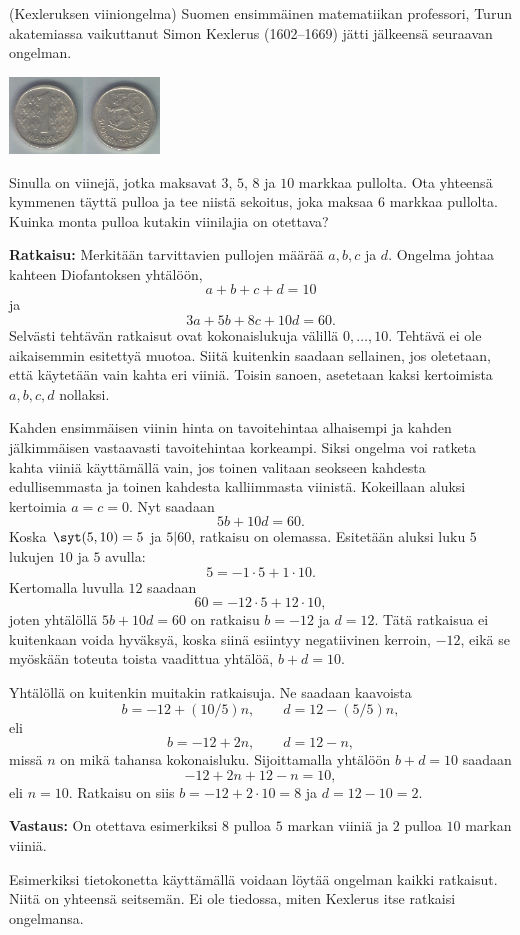 \begin{esimerkki}
 (Kexleruksen viiniongelma)
Suomen ensimmäinen matematiikan professori, Turun
akatemiassa vaikuttanut Simon Kexlerus (1602--1669) jätti
jälkeensä seuraavan ongelman.

\medskip

\begin{center}
\includegraphics[width=4cm]{pictures/wikimarkka.jpg}
\end{center}

\medskip

Sinulla on viinejä, jotka maksavat $3$, $5$, $8$ ja $10$
markkaa pullolta. Ota yhteensä kymmenen täyttä pulloa ja
tee niistä sekoitus, joka maksaa $6$ markkaa pullolta.
Kuinka monta pulloa kutakin viinilajia on otettava?

{\bf Ratkaisu:} Merkitään tarvittavien pullojen määrää
$a,b,c$ ja $d$. Ongelma johtaa kahteen Diofantoksen
yhtälöön,
\[
a+b+c+d = 10
\]
ja
\[
3a+5b+8c+10d = 60.
\]
Selvästi tehtävän ratkaisut ovat kokonaislukuja välillä
$0,\ldots,10$. Tehtävä ei ole aikaisemmin esitettyä
muotoa. Siitä kuitenkin saadaan sellainen, jos oletetaan,
että käytetään vain kahta eri viiniä. Toisin sanoen,
asetetaan kaksi kertoimista $a,b,c,d$ nollaksi.

Kahden ensimmäisen viinin hinta on tavoitehintaa
alhaisempi ja kahden jälkimmäisen vastaavasti
tavoitehintaa korkeampi. Siksi ongelma voi ratketa kahta
viiniä käyttämällä vain, jos toinen valitaan seokseen
kahdesta edullisemmasta ja toinen kahdesta kalliimmasta
viinistä. Kokeillaan aluksi kertoimia $a=c=0$. Nyt
saadaan
\[
5b + 10d = 60.
\]
Koska $\syt(5,10)=5$ ja $5|60$, ratkaisu on olemassa.
Esitetään aluksi luku $5$ lukujen $10$ ja $5$ avulla:
\[
5 = -1 \cdot 5 + 1\cdot 10.
\]
Kertomalla luvulla $12$ saadaan
\[
60 = -12\cdot 5 + 12\cdot 10,
\]
joten yhtälöllä $5b+10d=60$ on ratkaisu $b=-12$ ja $d=12$. Tätä ratkaisua ei kuitenkaan voida hyväksyä, koska siinä esiintyy negatiivinen kerroin, $-12$, eikä se myöskään toteuta toista vaadittua yhtälöä, $b+d=10$.

Yhtälöllä on kuitenkin muitakin ratkaisuja. Ne saadaan
kaavoista
\[
b= -12 + (10/5)n, \qquad d=12 - (5/5)n,
\]
eli
\[
b= -12 + 2n, \qquad d=12 - n,
\]
missä $n$ on mikä tahansa kokonaisluku. Sijoittamalla
yhtälöön $b+d=10$ saadaan
\[
-12 + 2n + 12 - n = 10,
\]
eli $n=10$. Ratkaisu on siis $b=-12+2 \cdot 10=8$ ja
$d=12-10=2$.

{\bf Vastaus:} On otettava esimerkiksi $8$ pulloa $5$
markan viiniä ja $2$ pulloa $10$ markan viiniä.

Esimerkiksi tietokonetta käyttämällä voidaan löytää
ongelman kaikki ratkaisut. Niitä on yhteensä seitsemän.
Ei ole tiedossa, miten Kexlerus itse ratkaisi ongelmansa.
\end{esimerkki}

